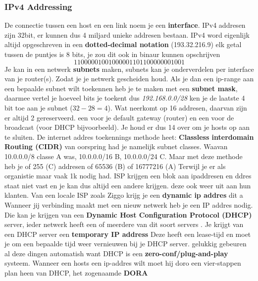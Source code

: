 \subsubsection{IPv4 Addressing}
De connectie tussen een host en een link noem je een \textbf{interface}.
\newline
IPv4 addresen zijn 32bit, er kunnen dus 4 miljard unieke addresen bestaan. IPv4 word eigenlijk altijd opgeschreven in
een \textbf{dotted-decimal notation} (193.32.216.9) elk getal tussen de puntjes is 8 bits, je zou dit ook in binaur
kunnen opschrijven
$$11000001 00100000 11011000 00001001$$
Je kan in een netwerk \textbf{subnets} maken, subnets kan je onderverdelen per interface van je router(s). Zodat je
je netwerk gescheiden houd. Als je dan een ip-range aan een bepaalde subnet wilt toekennen heb je te maken met een
\textbf{subnet mask}, daarmee vertel je hoeveel bits je toekent dus \textit{192.168.0.0/28} ken je de laatste 4 bit toe
aan je subnet ($32-28=4$). Wat neerkomt op 16 addresen, daarvan zijn er altijd 2 gereserveerd. een voor je default
gateway (router) en een voor de broadcast (voor DHCP bijvoorbeeld). Je houd er dus 14 over om je hosts op aan te
sluiten.
\newline
De internet addres toekennings methode heet: \textbf{Classless interdomain Routing (CIDR)} van oorspring had je
namelijk subnet classes. Waavan 10.0.0.0/8 classe A was, 10.0.0.0/16 B, 10.0.0.0/24 C. Maar met deze methode heb je
of 255 (C) addresen of 65536 (B) of 16777216 (A) Terwijl je er als organistie maar vaak 1k nodig had.
\newline
ISP krijgen een blok aan ipaddresen en ddres staat niet vast en je kan dus altijd een andere krijgen.
\newlinedelen deze ook weer uit aan hun klanten. Van een locale ISP zoals Ziggo krijg
je een \textbf{dynamic ip addres} dit a
Wanneer jij verbinding maakt met een nieuw netwerk heb je een IP addres nodig. Die kan je krijgen van een
\textbf{Dynamic Host Configuration Protocol (DHCP)} server, ieder netwerk heeft een of meerdere van dit soort servers
. Je krijgt van een DHCP server een \textbf{temporary IP address} Deze heeft een lease-tijd en moet je om een
bepaalde tijd weer vernieuwen bij je DHCP server. gelukkig gebeuren al deze dingen automatish want DHCP is een
\textbf{zero-conf/plug-and-play} systeem.
\newline
Wanneer een hosts een ip-addres wilt moet hij doro een vier-stappen plan heen van DHCP, het zogenaamde \textbf{DORA}
